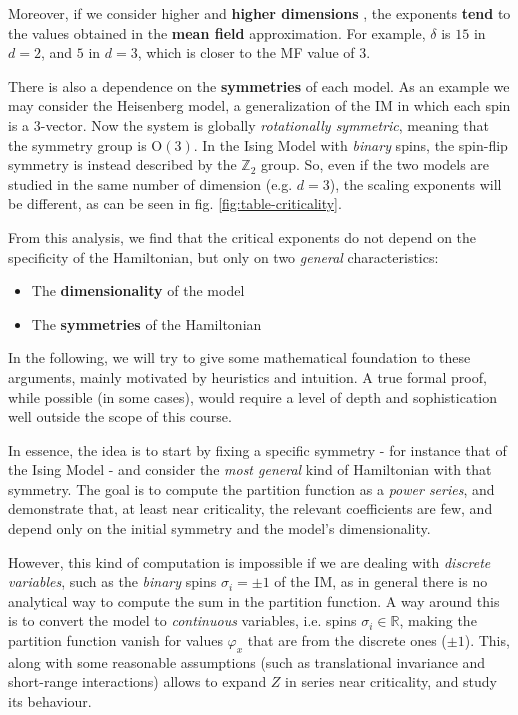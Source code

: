 \documentclass[../../main.tex]{subfiles}
\begin{document}
Moreover, if we consider higher and \textbf{higher dimensions} , the exponents \textbf{tend} to the values obtained in the \textbf{mean field} approximation. For example, $\delta$ is $15$ in $d=2$, and $5$ in $d=3$, which is closer to the MF value of $3$.

There is also a dependence on the \textbf{symmetries} of each model. As an example we may consider the Heisenberg model, a generalization of the IM in which each spin is a $3$-vector. Now the system is globally \textit{rotationally symmetric}, meaning that the symmetry group is $\mathrm{O}(3)$. In the Ising Model with \textit{binary} spins, the spin-flip symmetry is instead described by the $\mathbb{Z}_2$ group. So, even if the two models are studied in the same number of dimension (e.g. $d=3$), the scaling exponents will be different, as can be seen in fig. \ref{fig:table-criticality}. 

\medskip

From this analysis, we find that the critical exponents do not depend on the specificity of the Hamiltonian, but only on two \textit{general} characteristics:
\begin{itemize}
    \item The \textbf{dimensionality} of the model
    \item The \textbf{symmetries} of the Hamiltonian  
\end{itemize}

In the following, we will try to give some mathematical foundation to these arguments, mainly motivated by heuristics and intuition. A true formal proof, while possible (in some cases), would require a level of depth and sophistication well outside the scope of this course.

\medskip

In essence, the idea is to start by fixing a specific symmetry - for instance that of the Ising Model - and consider the \textit{most general} kind of Hamiltonian with that symmetry. The goal is to compute the partition function as a \textit{power series}, and demonstrate that, at least near criticality, the relevant coefficients are few, and depend only on the initial symmetry and the model's dimensionality.

\medskip

However, this kind of computation is impossible if we are dealing with \textit{discrete variables}, such as the \textit{binary} spins $\sigma_i = \pm 1$ of the IM, as in general there is no analytical way to compute the sum in the partition function. A way around this is to convert the model to \textit{continuous} variables, i.e. spins $\sigma_i \in \mathbb{R}$, making the partition function vanish for values $\varphi_x$ that are  from the discrete ones ($\pm 1$). This, along with some reasonable assumptions (such as translational invariance and short-range interactions) allows to expand $Z$ in series near criticality, and study its behaviour. 
\end{document}
